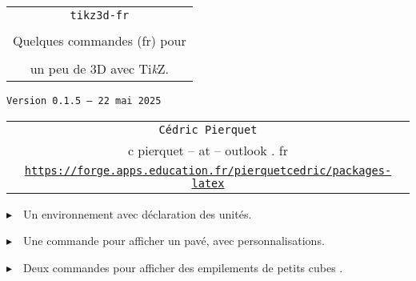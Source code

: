 \documentclass[french,a4paper,11pt]{article}
\def\TPversion{0.1.5}
\def\TPdate{22 mai 2025}
\providecommand\tikzlogo{Ti\textit{k}Z}
\let\TikZ\tikzlogo
\begin{document}
\setlength{\aweboxleftmargin}{0.07\linewidth}
\setlength{\aweboxcontentwidth}{0.93\linewidth}
\setlength{\aweboxvskip}{8pt}

\pagestyle{fancy}

\thispagestyle{empty}

\vspace{2cm}

\begin{center}
	\begin{minipage}{0.75\linewidth}
	\begin{tcolorbox}[colframe=yellow,colback=yellow!15]
		\begin{center}
			\begin{tabular}{c}
				{\Huge \texttt{tikz3d-fr}}\\
				\\
				{\LARGE Quelques commandes (fr) pour} \\
				\\
				{\LARGE un peu de 3D avec \TikZ.} \\
			\end{tabular}
			
			\bigskip
			
			{\small \texttt{Version \TPversion{} -- \TPdate}}
		\end{center}
	\end{tcolorbox}
\end{minipage}
\end{center}

\begin{center}
	\begin{tabular}{c}
	\texttt{Cédric Pierquet}\\
	{\ttfamily c pierquet -- at -- outlook . fr}\\
	\texttt{\url{https://forge.apps.education.fr/pierquetcedric/packages-latex}}
\end{tabular}
\end{center}

\vspace{0.25cm}

{$\blacktriangleright$~~Un environnement avec déclaration des unités.}

\smallskip

{$\blacktriangleright$~~Une commande pour afficher un pavé, avec personnalisations.}

\smallskip

{$\blacktriangleright$~~Deux commandes pour afficher des empilements de \og petits cubes \fg.}

\vspace{1cm}
\end{document}
